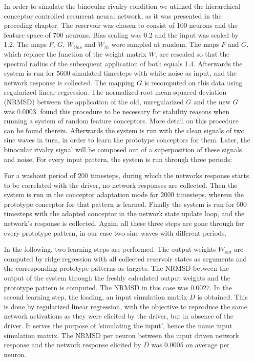 \documentclass[utf8]{frontiersSCNS} %
\begin{document}
	In order to simulate the binocular rivalry condition we utilized the hierarchical conceptor controlled recurrent neural network, as it was presented in the preceding chapter. The reservoir was chosen to consist of 100 neurons and the feature space of 700 neurons. Bias scaling was 0.2 and the input was scaled by 1.2. The maps $F$, $G$, $W_{bias}$ and $W_{in}$ were sampled at random.  
	The maps $F$ and $G$, which replace the function of the weight matrix $W$, are rescaled so that the spectral radius of the subsequent application of both equals 1.4. Afterwards the system is run for 5600 simulated timesteps with white noise as input, and the network response is collected. The mapping $G$ is recomputed on this data using regularized linear regression. The normalized root mean squared deviation (NRMSD) between the application of the old, unregularized $G$ and the new $G$ was 0.0003. \cite{Jaeger2014} found this procedure to be necessary for stability reasons when running a system of random feature conceptors. More detail on this procedure can be found therein. 
	Afterwards the system is run with the clean signals of two sine waves in turn, in order to learn the prototype conceptors for them. Later, the binocular rivalry signal will be composed out of a superposition of these signals and noise. For every input pattern, the system is run through three periods:
	
	For a washout period of 200 timesteps, during which the networks response starts to be correlated with the driver, no network responses are collected. Then the system is run in the conceptor adaptation mode for 2000 timesteps, wherein the prototype conceptor for that pattern is learned. Finally the system is run for 600 timesteps with the adapted conceptor in the network state update loop, and the network's response is collected. Again, all these three steps are gone through for every prototype pattern, in our case two sine waves with different periods. 
	
	In the following, two learning steps are performed. The output weights $W_{out}$ are computed by ridge regression with all collected reservoir states as arguments and the corresponding prototype patterns as targets. The NRMSD between the output of the system through the freshly calculated output weights and the prototype pattern is computed. The NRMSD in this case was 0.0027.
	In the second learning step, the loading, an input simulation matrix $D$ is obtained. This is done by regularized linear regression, with the objective to reproduce the same network activations as they were elicited by the driver, but in absence of the driver. It serves the purpose of 'simulating the input', hence the name input simulation matrix. The NRMSD per neuron between the input driven network response and the network response elicited by $D$ was 0.0005 on average per neuron.  
	
\end{document}
